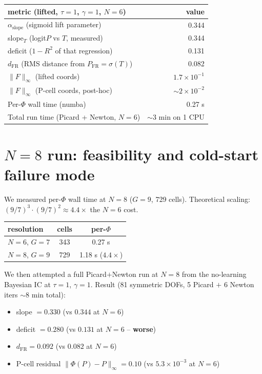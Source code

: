 \documentclass[11pt]{article}
\begin{document}
\begin{center}\begin{tabular}{lr}\toprule
metric (lifted, $\tau=1$, $\gamma=1$, $N=6$) & value \\\midrule
$\alpha_{\mathrm{slope}}$ (sigmoid lift parameter) & 0.344 \\
slope$_T$ (logit$P$ vs $T$, measured) & 0.344 \\
deficit ($1-R^2$ of that regression) & 0.131 \\
$d_{\mathrm{FR}}$ (RMS distance from $P_{\mathrm{FR}}=\sigma(T)$) & 0.082 \\
$\|F\|_\infty$ (lifted coords) & $1.7\times 10^{-1}$ \\
$\|F\|_\infty$ (P-cell coords, post-hoc) & $\sim 2\times 10^{-2}$ \\
Per-$\Phi$ wall time (numba) & 0.27 s \\
Total run time (Picard + Newton, $N=6$) & $\sim 3$ min on 1 CPU \\
\bottomrule\end{tabular}\end{center}

\section{$N=8$ run: feasibility and cold-start failure mode}

We measured per-$\Phi$ wall time at $N=8$ ($G=9$, 729 cells). Theoretical
scaling: $(9/7)^3 \cdot (9/7)^2 \approx 4.4\times$ the $N=6$ cost.

\begin{center}\begin{tabular}{lcc}\toprule
resolution & cells & per-$\Phi$ \\\midrule
$N=6$, $G=7$ & 343 & 0.27 s \\
$N=8$, $G=9$ & 729 & 1.18 s ($4.4\times$) \\
\bottomrule\end{tabular}\end{center}

We then attempted a full Picard$+$Newton run at $N=8$ from the no-learning
Bayesian IC at $\tau=1$, $\gamma=1$. Result (81 symmetric DOFs, 5 Picard $+$ 6
Newton iters $\sim 8$ min total):
\begin{itemize}
\item slope $=0.330$ (vs $0.344$ at $N=6$)
\item deficit $=0.280$ (vs $0.131$ at $N=6$ -- \textbf{worse})
\item $d_\mathrm{FR}=0.092$ (vs $0.082$ at $N=6$)
\item P-cell residual $\|\Phi(P)-P\|_\infty = 0.10$ (vs $5.3\times 10^{-3}$ at $N=6$)
\end{itemize}
\end{document}
